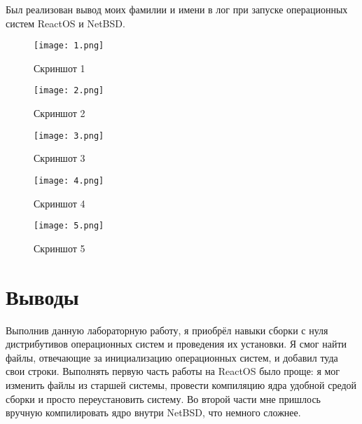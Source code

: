 \documentclass[a4paper, 14pt]{extarticle}
\begin{document}
\begin{flushleft}
Был реализован вывод моих фамилии и имени в лог при запуске операционных систем ReactOS и NetBSD. 

\begin{figure}[H]

\centering

\texttt{[image: 1.png]}

\caption{Скриншот 1}

\label{fig:mpr}

\end{figure}

\begin{figure}[H]

\centering

\texttt{[image: 2.png]}

\caption{Скриншот 2}

\label{fig:mpr}

\end{figure}

\begin{figure}[H]

\centering

\texttt{[image: 3.png]}

\caption{Скриншот 3}

\label{fig:mpr}

\end{figure}

\begin{figure}[H]

\centering

\texttt{[image: 4.png]}

\caption{Скриншот 4}

\label{fig:mpr}

\end{figure}

\begin{figure}[H]

\centering

\texttt{[image: 5.png]}

\caption{Скриншот 5}

\label{fig:mpr}

\end{figure}

\end{flushleft}
\pagebreak 

\section{Выводы}
Выполнив данную лабораторную работу, я приобрёл навыки сборки с нуля дистрибутивов операционных систем и проведения их установки. Я смог найти файлы, отвечающие за инициализацию операционных систем, и добавил туда свои строки. Выполнять первую часть работы на ReactOS было проще: я мог изменить файлы из старшей системы, провести компиляцию ядра удобной средой сборки и просто переустановить систему. Во второй части мне пришлось вручную компилировать ядро внутри NetBSD, что немного сложнее.
\pagebreak
\end{document}
